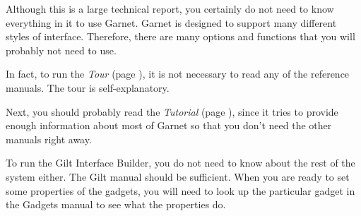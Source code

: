 \documentclass{report}
\begin{document}
Although this is a large technical report, you certainly do not need
to know everything in it to use Garnet.  Garnet is designed to support
many different styles of interface.  Therefore, there are many options
and functions that you will probably not need to use.

In fact, to run the {\it Tour} (page \pageref{tour}), it is not
necessary to read any of the reference manuals.  The tour is
self-explanatory.

Next, you should probably read the {\it Tutorial} (page
\pageref{tutorial}), since it tries to provide enough information about
most of Garnet so that you don't need the other manuals right away.

To run the Gilt Interface Builder, you do not need to know about the
rest of the system either.  The Gilt manual should be sufficient.
When you are ready to set some properties of the gadgets, you will
need to look up the particular gadget in the Gadgets manual to see
what the properties do.
\end{document}

